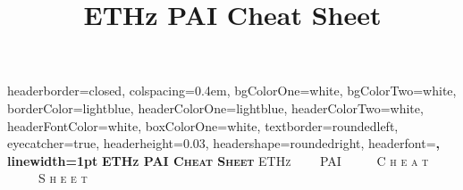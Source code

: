 \documentclass[landscape,a0paper,fontscale=0.285]{baposter} %
\title{ETHz PAI Cheat Sheet}
\begin{document}
\begin{poster}
{
headerborder=closed, %
colspacing=0.4em, %
bgColorOne=white, %
bgColorTwo=white, %
borderColor=lightblue, %
headerColorOne=lightblue, %
headerColorTwo=white, %
headerFontColor=white, %
boxColorOne=white, %
textborder=roundedleft, %
eyecatcher=true, %
headerheight=0.03\textheight, %
headershape=roundedright, %
headerfont=\Large\bf\textsc, %
linewidth=1pt %
}
{\bf\textsc{ETHz PAI Cheat Sheet}\vspace{0.0em}} %
{\textsc{ ETHz \ \ \ \ PAI \ \ \ \ \ C h e a t \ \ \ \ \ S h e e t \hspace{0pt}}}


\end{poster}
\end{document}
